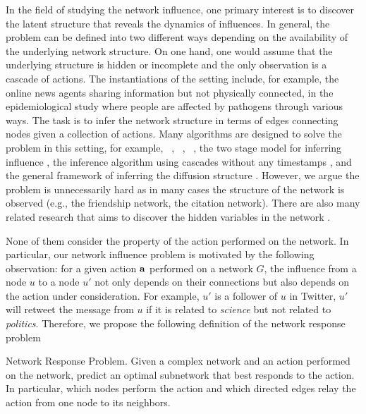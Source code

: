 {In the field of studying the network influence, one primary interest is to discover the latent structure that reveals the dynamics of influences.
In general, the problem can be defined into two different ways depending on the availability of the underlying network structure.
On one hand, one would assume that the underlying structure is hidden or incomplete and the only observation is a cascade of actions.
The instantiations of the setting include, for example,
the online news agents sharing information but not physically connected,
in the epidemiological study where people are affected by pathogens through various ways.
The task is to infer the network structure in terms of edges connecting nodes given a collection of actions.
Many algorithms are designed to solve the problem in this setting, for example, \netinf\ \citep{GomezRodriguez10inferring}, \netrate\ \citep{Rodrigues11unconvering}, \ \citep{Du12learning}, the two stage model for inferring influence \citep{Du14influence}, the inference algorithm using cascades without any timestamps \citep{Amin14learning}, and the general framework of inferring the diffusion structure \citep{Daneshmand14estimating}.
However, we argue the problem is unnecessarily hard as in many cases the structure of the network is observed (e.g., the friendship network, the citation network).
There are also many related research that aims to discover the hidden variables in the network \citep{Lovrek08prediction,Goyal10learning}.

None of them consider the property of the action performed on the network.
In particular, our network influence problem is motivated by the following observation: for a given action $\mathbf {a}$ performed on a network $G$, the influence from a node $u$ to a node $u'$ not only depends on their connections but also depends on the action under consideration.
For example, $u'$ is a follower of $u$ in Twitter, $u'$ will retweet the message from $u$ if it is related to \textit{science} but not related to \textit{politics}.
Therefore, we propose the following definition of the network response problem
\begin{definition}{Network Response Problem.}
	Given a complex network and an action performed on the network, predict an optimal subnetwork that best responds to the action. In particular, which nodes perform the action and which directed edges relay the action from one node to its neighbors.
\end{definition}

}
